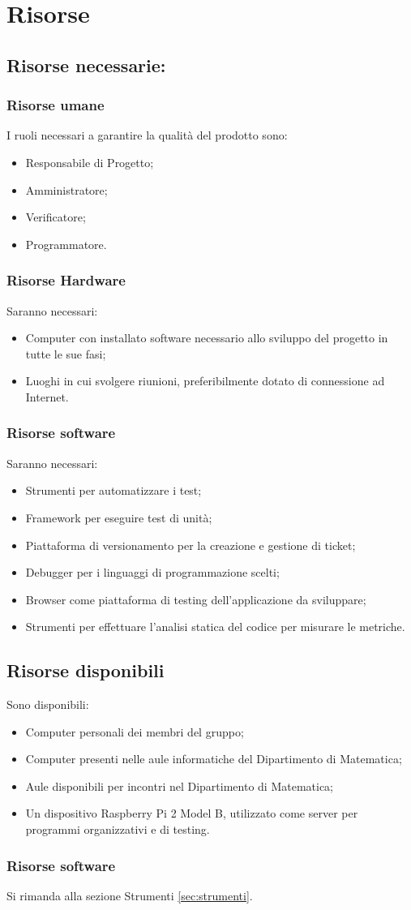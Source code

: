 \section{Risorse}{
\subsection{Risorse necessarie:}{
	\subsubsection{Risorse umane}{
		I ruoli necessari a garantire la qualità del prodotto sono:
		\begin{itemize}
			\item Responsabile di Progetto;
			\item Amministratore;
			\item Verificatore;
			\item Programmatore. 
		\end{itemize}
	}
	\subsubsection{Risorse Hardware}{
		Saranno necessari:
		\begin{itemize}
			\item Computer con installato software necessario allo sviluppo del progetto in tutte le sue fasi;
			\item Luoghi in cui svolgere riunioni, preferibilmente dotato di connessione ad Internet.
		\end{itemize}
	}
	\subsubsection{Risorse software}{
		Saranno necessari:
		\begin{itemize}
			\item Strumenti per automatizzare i test;
			\item Framework per eseguire test di unità;
			\item Piattaforma di versionamento per la creazione e gestione di ticket;
			\item Debugger per i linguaggi di programmazione scelti;
			\item Browser come piattaforma di testing dell'applicazione da sviluppare;
			\item Strumenti per effettuare l'analisi statica del codice per misurare le metriche.
		\end{itemize}
	}
}
\subsection{Risorse disponibili}{
	Sono disponibili:
	\begin{itemize}
		\item Computer personali dei membri del gruppo;
		\item Computer presenti nelle aule informatiche del Dipartimento di Matematica;
		\item Aule disponibili per incontri nel Dipartimento di Matematica;
		\item Un dispositivo Raspberry Pi 2 Model B, utilizzato come server per programmi organizzativi e di testing.
	\end{itemize}
	\subsubsection{Risorse software}{
		Si rimanda alla sezione Strumenti \ref{sec:strumenti}.
	}
}
}